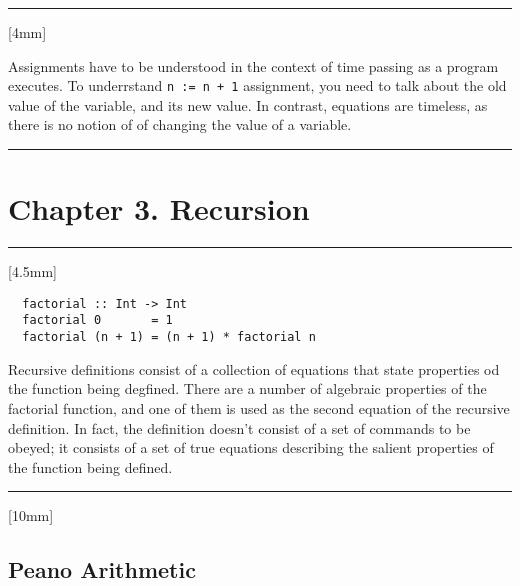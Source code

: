 \documentclass[11pt,a4paper]{article}
\theoremstyle{definition}
\begin{document}
\rule{\textwidth}{0.1pt}\vspace{5mm}
[4mm]

Assignments have to be understood in the context of time passing as a program executes.
To underrstand \texttt{n := n + 1} assignment, you need to talk about the old value
of the variable, and its new value. In contrast, equations are timeless, as there is
no notion of of changing the value of a variable.

\vspace{5mm}\rule{\textwidth}{0.1pt}

\newpage
\section*{Chapter 3. Recursion}


\vspace{5mm}\rule{\textwidth}{0.1pt}\vspace{5mm}
[4.5mm]

\begin{lstlisting}
  factorial :: Int -> Int
  factorial 0       = 1
  factorial (n + 1) = (n + 1) * factorial n
\end{lstlisting}

\vspace{5mm}

Recursive definitions consist of a collection of equations that state properties od
the function being degfined. There are a number of algebraic properties of the
factorial function, and one of them is used as the second equation of the recursive
definition. In fact, the definition doesn't consist of a set of commands to be
obeyed; it consists of a set of true equations describing the salient properties
of the function being defined.

\vspace{5mm}\rule{\textwidth}{0.1pt}\vspace{2mm}
[10mm]

\subsection*{Peano Arithmetic}
\end{document}
